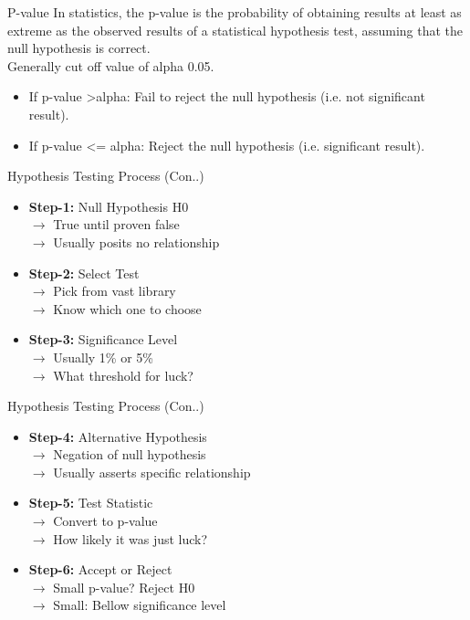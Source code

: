 \begin{frame}[t]{P-value}
		In statistics, the p-value is the probability of obtaining results at least as extreme as the observed results of a statistical hypothesis test, assuming that the null hypothesis is correct. \\
		Generally cut off value of alpha 0.05. \\
	\begin{itemize}		
		\item If p-value \textgreater alpha: Fail to reject the null hypothesis (i.e. not significant result).
		\item If p-value \textless= alpha: Reject the null hypothesis (i.e. significant result).
	\end{itemize}
\end{frame}

\begin{frame}[t]{Hypothesis Testing Process  (Con..)}
	\begin{itemize}	
		\item \textbf{Step-1: } Null Hypothesis H0 \\
		${\rightarrow}$ True until proven false \\
		${\rightarrow}$ Usually posits no relationship
		\item \textbf{Step-2: } Select Test \\
		${\rightarrow}$ Pick from vast library \\
		${\rightarrow}$ Know which one to choose
		\item \textbf{Step-3: } Significance Level \\
		${\rightarrow}$	Usually 1\% or 5\%  \\
		${\rightarrow}$ What threshold for luck?
	
	\end{itemize}
\end{frame}
\begin{frame}[t]{Hypothesis Testing Process (Con..)}
	\begin{itemize}	
		\item \textbf{Step-4: } Alternative Hypothesis \\
		${\rightarrow}$ Negation of null hypothesis \\
		${\rightarrow}$ Usually asserts specific relationship
		\item \textbf{Step-5: } Test Statistic \\
		${\rightarrow}$ Convert to p-value \\
		${\rightarrow}$ How likely it was just luck?
		\item \textbf{Step-6: } Accept or Reject \\
		${\rightarrow}$	Small p-value? Reject H0  \\
		${\rightarrow}$ Small: Bellow significance level
		
	\end{itemize}
\end{frame}

